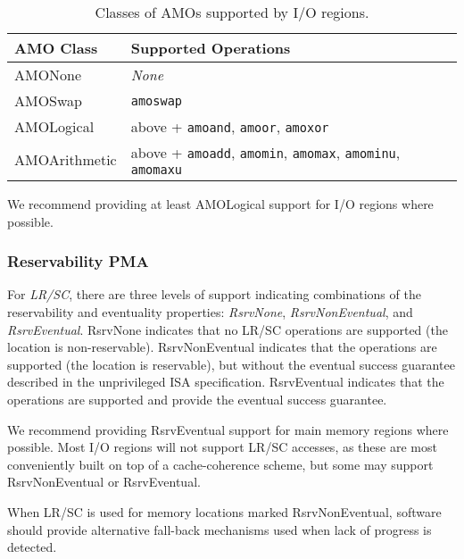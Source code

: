 \begin{table*}[h!]
\begin{center}
\begin{tabular}{|l|l|}
  \hline
  AMO Class & Supported Operations \\
  \hline
  AMONone       & {\em None} \\
  AMOSwap       & {\tt amoswap} \\
  AMOLogical    & above + {\tt amoand}, {\tt amoor}, {\tt amoxor} \\
  AMOArithmetic & above + {\tt amoadd}, {\tt amomin}, {\tt amomax}, {\tt amominu}, {\tt amomaxu} \\
  \hline
\end{tabular}
\end{center}
\caption{Classes of AMOs supported by I/O regions.}
\label{amoclasses}
\end{table*}

\begin{commentary}
We recommend providing at least AMOLogical support for I/O regions
where possible.
\end{commentary}

\subsubsection{Reservability PMA}

For {\em LR/SC}, there are three levels of support indicating combinations of
the reservability and eventuality properties:  {\em RsrvNone},
{\em RsrvNonEventual}, and {\em RsrvEventual}.
RsrvNone indicates that no LR/SC operations are supported (the location is
non-reservable).  RsrvNonEventual indicates that the operations are supported
(the location is reservable), but without the eventual success guarantee
described in the unprivileged ISA specification.  RsrvEventual indicates that
the operations are supported and provide the eventual success guarantee.

\begin{commentary}
We recommend providing RsrvEventual support for main memory regions
where possible.  Most I/O regions will not support LR/SC accesses, as
these are most conveniently built on top of a cache-coherence scheme, but some
may support RsrvNonEventual or RsrvEventual.
\end{commentary}

\begin{commentary}
When LR/SC is used for memory locations marked RsrvNonEventual, software should
provide alternative fall-back mechanisms used when lack of progress is
detected.
\end{commentary}

